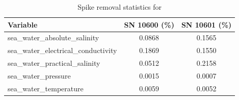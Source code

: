\begin{table}[h]
\centering
\caption{Spike removal statistics for \projectname{} \casenumber{}}
\label{tab:str22_spike_stats}
\begin{tabular}{|l|c|c|}
\hline
Variable & SN 10600 (\%) & SN 10601 (\%) \\
\hline
sea\_water\_absolute\_salinity & 0.0868 & 0.1565 \\
sea\_water\_electrical\_conductivity & 0.1869 & 0.1550 \\
sea\_water\_practical\_salinity & 0.0512 & 0.2158 \\
sea\_water\_pressure & 0.0015 & 0.0007 \\
sea\_water\_temperature & 0.0059 & 0.0052 \\
\hline
\end{tabular}
\end{table}
